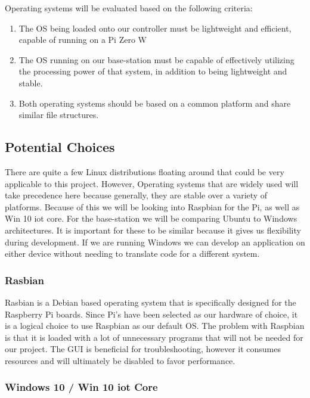 \documentclass[letterpaper, 10, draftclsnofoot, onecolumn]{IEEEtran}
\begin{document}
Operating systems will be evaluated based on the following criteria:
\begin{enumerate}
\item{The OS being loaded onto our controller must be lightweight 
and efficient, capable of running on a Pi Zero W}

\item{The OS running on our base-station must be capable of 
effectively utilizing the processing power of that system, in 
addition to being lightweight and stable.}

\item{Both operating systems should be based on a common platform 
and share similar file structures.}
\end{enumerate}

\subsection{Potential Choices}

There are quite a few Linux distributions floating around that 
could be very applicable to this project. However, Operating 
systems that are widely used will take precedence here because 
generally, they are stable over a variety of platforms. Because of 
this we will be looking into Raspbian for the Pi, as well as Win 10 
iot core. For the base-station we will be comparing Ubuntu to 
Windows architectures. It is important for these to be similar 
because it gives us flexibility during development. If we are 
running Windows we can develop an application on either device 
without needing to translate code for a different system.

\subsubsection{Rasbian}

Rasbian\cite{r5} is a Debian based operating system that is specifically 
designed for the Raspberry Pi boards. Since Pi's have been selected 
as our hardware of choice, it is a logical choice to use Raspbian as 
our default OS. The problem with Raspbian is that it is loaded with 
a lot of unnecessary programs that will not be needed for our 
project. The GUI is beneficial for troubleshooting, however it 
consumes resources and will ultimately be disabled to favor 
performance. 


\subsubsection{Windows 10 / Win 10 iot Core}
\end{document}
